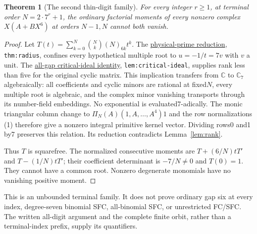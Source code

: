 \documentclass[11pt]{article}
\newtheorem{theorem}[lemma]{Theorem}
\begin{document}
\begin{theorem}[The second thin-digit family]\label{thm:family}
For every integer $r\ge1$, at terminal order $N=2\cdot7^r+1$,
the ordinary factorial moments of every nonzero complex
$X(A+BX^6)$ at orders $N-1,N$ cannot both vanish.
\end{theorem}
\begin{proof}
Let $T(t)=\sum_{k=0}^N\binom Nk(N)_{6k}t^k$.
The \href{PHYSICAL_PRIME_TOTAL_DEGREE_REDUCTION.tex}{physical-prime reduction},
\texttt{thm:radius}, confines every hypothetical multiple root
to $u=-1/t=7v$ with $v$ a unit.
The \href{gap_three_hurwitz_structure.tex}{all-gap critical-ideal identity},
\texttt{lem:critical-ideal}, supplies rank less than five for
the original cyclic matrix.
This implication transfers from $\mathbb C$ to $\mathbb C_7$
algebraically: all coefficients and cyclic minors are rational
at fixed$N$, every multiple root is algebraic, and the complex
minor vanishing transports through its number-field embeddings.
No exponential is evaluated7-adically.
The monic triangular column change to
$\Pi_N(A)(1,A,\ldots,A^4)1$ and the row normalizations (1)
therefore give a nonzero integral primitive kernel vector.
Dividing rows0 and1 by7 preserves this relation.
Its reduction contradicts Lemma~\ref{lem:rank}.

Thus $T$ is squarefree.
The normalized consecutive moments are
$T+(6/N)tT'$ and $T-(1/N)tT'$;
their coefficient determinant is $-7/N\ne0$ and $T(0)=1$.
They cannot have a common root.
Nonzero degenerate monomials have no vanishing positive moment.
\end{proof}
This is an unbounded terminal family.
It does not prove ordinary gap six at every index,
degree-seven binomial SFC, all-binomial SFC, or unrestricted FC/SFC.
The written all-digit argument and the complete finite orbit,
rather than a terminal-index prefix, supply its quantifiers.
\end{document}
